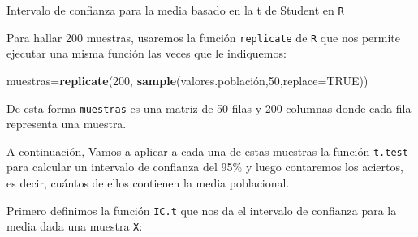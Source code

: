 \documentclass[ignorenonframetext,]{beamer}
\newenvironment{Shaded}{\begin{snugshade}}{\end{snugshade}}
\newcommand{\ControlFlowTok}[1]{\textcolor[rgb]{0.13,0.29,0.53}{\textbf{#1}}}
\newcommand{\DataTypeTok}[1]{\textcolor[rgb]{0.13,0.29,0.53}{#1}}
\newcommand{\DecValTok}[1]{\textcolor[rgb]{0.00,0.00,0.81}{#1}}
\newcommand{\KeywordTok}[1]{\textcolor[rgb]{0.13,0.29,0.53}{\textbf{#1}}}
\newcommand{\NormalTok}[1]{#1}
\newcommand{\OperatorTok}[1]{\textcolor[rgb]{0.81,0.36,0.00}{\textbf{#1}}}
\newcommand{\OtherTok}[1]{\textcolor[rgb]{0.56,0.35,0.01}{#1}}
\newcommand{\StringTok}[1]{\textcolor[rgb]{0.31,0.60,0.02}{#1}}
\begin{document}
\begin{frame}[fragile]{Intervalo de confianza para la media basado en la
t de Student en \texttt{R}}
\protect\hypertarget{intervalo-de-confianza-para-la-media-basado-en-la-t-de-student-en-r-4}{}

Para hallar 200 muestras, usaremos la función \texttt{replicate} de
\texttt{R} que nos permite ejecutar una misma función las veces que le
indiquemos:

\begin{Shaded}
\begin{Highlighting}[]
\NormalTok{muestras=}\KeywordTok{replicate}\NormalTok{(}\DecValTok{200}\NormalTok{, }\KeywordTok{sample}\NormalTok{(valores.población,}\DecValTok{50}\NormalTok{,}\DataTypeTok{replace=}\OtherTok{TRUE}\NormalTok{))}
\end{Highlighting}
\end{Shaded}

De esta forma \texttt{muestras} es una matriz de 50 filas y 200 columnas
donde cada fila representa una muestra.

A continuación, Vamos a aplicar a cada una de estas muestras la función
\texttt{t.test} para calcular un intervalo de confianza del 95\% y luego
contaremos los aciertos, es decir, cuántos de ellos contienen la media
poblacional.

Primero definimos la función \texttt{IC.t} que nos da el intervalo de
confianza para la media dada una muestra \texttt{X}:

\begin{Shaded}
\end{Shaded}

\end{frame}
\end{document}
